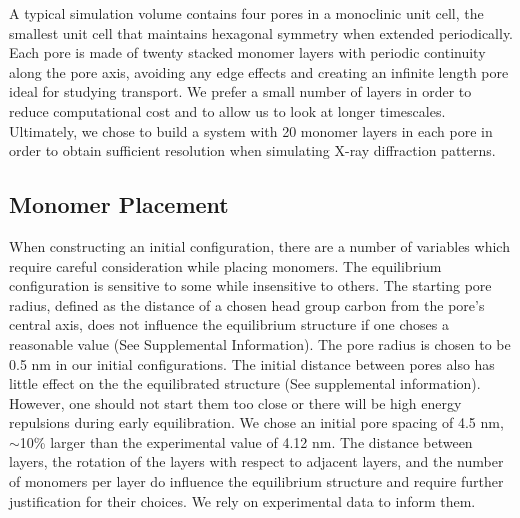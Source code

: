 \documentclass{article}
\begin{document}
  A typical simulation volume contains four pores in a monoclinic unit cell,
  the smallest unit cell that maintains hexagonal symmetry when extended
  periodically. Each pore is made of twenty stacked monomer layers with periodic
  continuity along the pore axis, avoiding any edge effects and creating an
  infinite length pore ideal for studying transport. We prefer a small number of layers
  in order to reduce computational cost and to allow us to look at
  longer timescales. Ultimately, we chose to build a system with 20 monomer
  layers in each pore in order to obtain sufficient resolution when simulating
  X-ray diffraction patterns. %

\subsection{Monomer Placement} 

  When constructing an initial configuration, there are a number of variables
  which require careful consideration while placing monomers. The equilibrium
  configuration is sensitive to some while insensitive to others. The starting
  pore radius, defined as the distance of a chosen head group carbon from the
  pore's central axis, does not influence the equilibrium structure if one choses
  a reasonable value (See Supplemental Information). The pore radius is chosen to
  be 0.5 nm in our initial configurations. The initial distance between pores
  also has little effect on the the equilibrated structure (See supplemental
  information). However, one should not start them too close or there will be
  high energy repulsions during early equilibration. We chose an initial pore
  spacing of 4.5 nm, $\sim$10\% larger than the experimental value of 4.12 nm.
  The distance between layers, the rotation of the layers with respect to
  adjacent layers, and the number of monomers per layer do influence the
  equilibrium structure and require further justification for their choices.  We
  rely on experimental data to inform them. 
\end{document}

